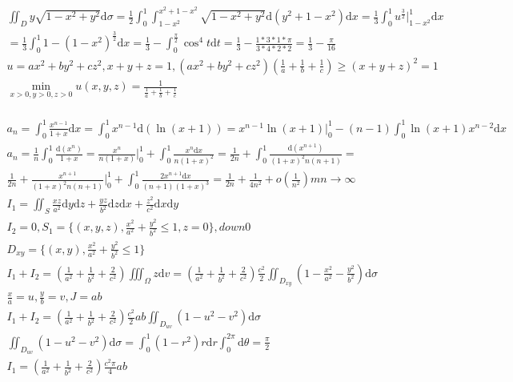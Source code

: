 \documentclass{article}
\begin{document}
\begin{align*}
    \iint_{D} y\sqrt{1-x^2+y^2}\mathrm{d}\sigma = \frac{1}{2} \int_{0}^{1} \int_{1-x^2}^{x^2+1-x^2} \sqrt{1-x^2+y^2} \mathrm{d}(y^2+1-x^2)\mathrm{d}x = \frac{1}{3} \int_{0}^{1} u^{\frac{3}{2}}|_{1-x^2}^{1} \mathrm{d}x\\
    = \frac{1}{3}\int_{0}^{1} 1-(1-x^2)^{\frac{3}{2}} \mathrm{d}x = \frac{1}{3} - \int_{0}^{\frac{\pi}{2}} \cos^4 t\mathrm{d}t = \frac{1}{3} - \frac{1*3*1*\pi}{3*4*2*2} = \frac{1}{3} - \frac{\pi}{16} \\
    u = ax^2+by^2+cz^2 , x+y+z=1 , (ax^2+by^2+cz^2)(\frac{1}{a}+\frac{1}{b}+\frac{1}{c}) \ge (x+y+z)^2 = 1 \\
    \min_{x>0,y>0,z>0} {u(x,y,z)} = \frac{1}{\frac{1}{a}+\frac{1}{b}+\frac{1}{c}}\\ 
\end{align*}
    

\clearpage
\begin{align*}
    a_{n} = \int_{0}^{1} \frac{x^{n-1}}{1+x}\mathrm{d}x = \int_{0}^{1} x^{n-1}\mathrm{d}(\ln(x+1)) = x^{n-1}\ln(x+1)|_{0}^{1} - (n-1)\int_{0}^{1}\ln(x+1)x^{n-2}\mathrm{d}x\\ 
    a_{n} = \frac{1}{n}\int_{0}^{1}\frac{\mathrm{d}(x^n)}{1+x} = \frac{x^n}{n(1+x)}|_{0}^{1} + \int_{0}^{1}\frac{x^n\mathrm{d}x}{n(1+x)^2} = \frac{1}{2n} + \int_{0}^{1}\frac{\mathrm{d}(x^{n+1})}{(1+x)^2 n(n+1)} =\\ 
    \frac{1}{2n} + \frac{x^{n+1}}{(1+x)^2 n(n+1)}|_{0}^{1} + \int_{0}^{1}\frac{2x^{n+1}\mathrm{d}x}{(n+1)(1+x)^3} = \frac{1}{2n} + \frac{1}{4n^2}+o(\frac{1}{n^2}) m n \to \infty \\ 
    I_{1} = \iint_{S} \frac{xz}{a^2}\mathrm{d}y\mathrm{d}z+\frac{yz}{b^2}\mathrm{d}z\mathrm{d}x+\frac{z^2}{c^2} \mathrm{d}x\mathrm{d}y\\
    I_{2} = 0 , S_{1} = \{(x,y,z),\frac{x^2}{a^2}+\frac{y^2}{b^2} \le 1,z = 0 \},down0 \\
    D_{xy} = \{(x,y),\frac{x^2}{a^2}+\frac{y^2}{b^2} \le 1\} \\
    I_{1}+I_{2} = \left(\frac{1}{a^2}+\frac{1}{b^2}+\frac{2}{c^2}\right) \iiint_{\Omega} z\mathrm{d}v = \left(\frac{1}{a^2}+\frac{1}{b^2}+\frac{2}{c^2}\right)\frac{c^2}{2}\iint_{D_{xy}} \left(1-\frac{x^2}{a^2}-\frac{y^2}{b^2}\right)\mathrm{d}\sigma \\
    \frac{x}{a} = u , \frac{y}{b} = v ,J = ab \\
    I_{1}+I_{2} = \left(\frac{1}{a^2}+\frac{1}{b^2}+\frac{2}{c^2}\right)\frac{c^2}{2}ab \iint_{D_{uv}}(1-u^2-v^2)\mathrm{d}\sigma \\ 
    \iint_{D_{uv}}(1-u^2-v^2)\mathrm{d}\sigma = \int_{0}^{1}(1-r^2)r\mathrm{d}r\int_{0}^{2\pi}\mathrm{d}\theta = \frac{\pi}{2} \\
    I_{1} = \left(\frac{1}{a^2}+\frac{1}{b^2}+\frac{2}{c^2}\right)\frac{c^2\pi}{4}ab  \\ 
\end{align*}
    
\end{document}
